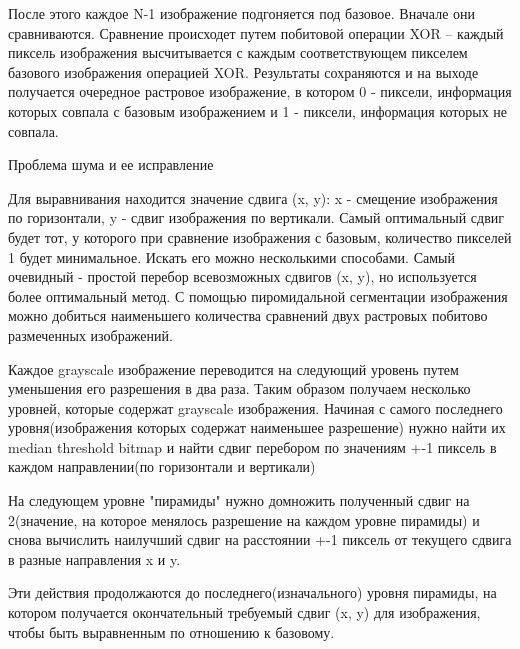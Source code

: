    После этого каждое N-1 изображение подгоняется под базовое. Вначале они сравниваются. Сравнение происходет путем побитовой операции XOR -- каждый пиксель изображения высчитывается с каждым соответствующем пикселем базового изображения операцией XOR. Результаты сохраняются и на выходе получается очередное растровое изображение, в котором 0 - пиксели, информация которых совпала с базовым изображением и 1 - пиксели, информация которых не совпала.

Проблема шума и ее исправление

    Для выравнивания находится значение сдвига (x, y): x - смещение изображения по горизонтали, y - сдвиг изображения по вертикали.
Самый оптимальный сдвиг будет тот, у которого при сравнение изображения с базовым, количество пикселей 1 будет минимальное. Искать его можно несколькими способами. Самый очевидный - простой перебор всевозможных сдвигов (x, y), но используется более оптимальный метод. С помощью пиромидальной сегментации изображения можно добиться наименьшего количества сравнений двух растровых побитово размеченных изображений.

Каждое grayscale изображение переводится на следующий уровень путем уменьшения его разрешения в два раза. Таким образом получаем несколько уровней, которые содержат grayscale изображения. Начиная с самого последнего уровня(изображения которых содержат наименьшее разрешение) нужно найти их median threshold bitmap и найти сдвиг перебором по значениям +-1 пиксель в каждом направлении(по горизонтали и вертикали)

На следующем уровне "пирамиды" нужно домножить полученный сдвиг на 2(значение, на которое менялось разрешение на каждом уровне пирамиды) и снова вычислить наилучший сдвиг на расстоянии +-1 пиксель от текущего сдвига в разные направления x и y.

Эти действия продолжаются до последнего(изначального) уровня пирамиды, на котором получается окончательный требуемый сдвиг (x, y) для изображения, чтобы быть выравненным по отношению к базовому.
